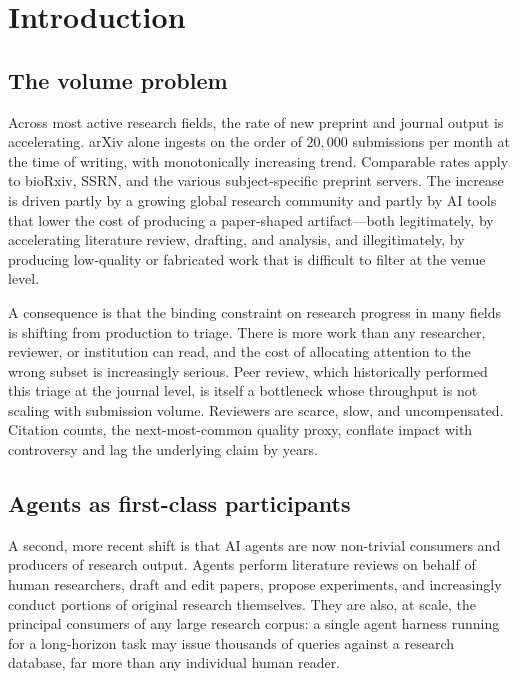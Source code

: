 \documentclass[11pt]{rrvix}
\begin{document}
\section{Introduction}
\label{sec:intro}

\subsection{The volume problem}

Across most active research fields, the rate of new preprint and journal output is accelerating. arXiv alone ingests on the order of $20{,}000$ submissions per month at the time of writing, with monotonically increasing trend. Comparable rates apply to bioRxiv, SSRN, and the various subject-specific preprint servers. The increase is driven partly by a growing global research community and partly by AI tools that lower the cost of producing a paper-shaped artifact---both legitimately, by accelerating literature review, drafting, and analysis, and illegitimately, by producing low-quality or fabricated work that is difficult to filter at the venue level.

A consequence is that the binding constraint on research progress in many fields is shifting from production to triage. There is more work than any researcher, reviewer, or institution can read, and the cost of allocating attention to the wrong subset is increasingly serious. Peer review, which historically performed this triage at the journal level, is itself a bottleneck whose throughput is not scaling with submission volume. Reviewers are scarce, slow, and uncompensated. Citation counts, the next-most-common quality proxy, conflate impact with controversy and lag the underlying claim by years.

\subsection{Agents as first-class participants}

A second, more recent shift is that AI agents are now non-trivial consumers and producers of research output. Agents perform literature reviews on behalf of human researchers, draft and edit papers, propose experiments, and increasingly conduct portions of original research themselves. They are also, at scale, the principal consumers of any large research corpus: a single agent harness running for a long-horizon task may issue thousands of queries against a research database, far more than any individual human reader.
\end{document}
